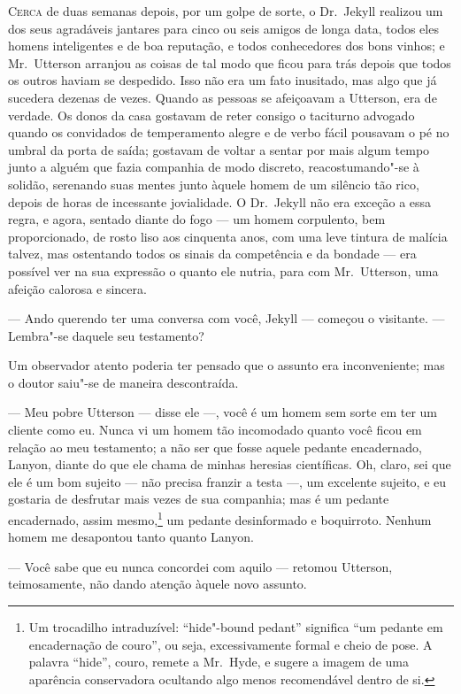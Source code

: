 \textsc{Cerca} de duas semanas depois, por um golpe de sorte, o Dr.~Jekyll
realizou um dos seus agradáveis jantares para cinco ou seis amigos de
longa data, todos eles homens inteligentes e de boa reputação, e todos
conhecedores dos bons vinhos; e Mr.~Utterson arranjou as coisas de tal
modo que ficou para trás depois que todos os outros haviam se
despedido.  Isso não era um fato inusitado, mas algo que já sucedera
dezenas de vezes.  Quando as pessoas se afeiçoavam a Utterson, era de
verdade.  Os donos da casa gostavam de reter consigo o taciturno
advogado quando os convidados de temperamento alegre e de verbo
fácil pousavam o pé no umbral da porta de saída; gostavam de voltar a
sentar por mais algum tempo junto a alguém que fazia companhia de modo
discreto, reacostumando"-se à solidão, serenando suas mentes junto
àquele homem de um silêncio tão rico, depois de horas de incessante
jovialidade.  O Dr.~Jekyll não era exceção a essa regra, e agora,
sentado diante do fogo --- um homem corpulento, bem proporcionado, de
rosto liso aos cinquenta anos, com uma leve tintura de malícia talvez,
mas ostentando todos os sinais da competência e da bondade --- era
possível ver na sua expressão o quanto ele nutria, para com Mr.~Utterson, 
uma afeição calorosa e sincera.

--- Ando querendo ter uma conversa com você, Jekyll --- começou o
visitante. --- Lembra"-se daquele seu testamento? 

Um observador atento poderia ter pensado que o assunto era
inconveniente; mas o doutor saiu"-se de maneira descontraída.

--- Meu pobre Utterson --- disse ele ---, você é um homem sem sorte em ter um
cliente como eu.  Nunca vi um homem tão incomodado quanto você ficou em
relação ao meu testamento; a não ser que fosse aquele pedante
encadernado, Lanyon, diante do que ele chama de minhas heresias
científicas.  Oh, claro, sei que ele é um bom sujeito --- não precisa
franzir a testa ---, um excelente sujeito, e eu gostaria de desfrutar mais
vezes de sua companhia; mas é um pedante encadernado, assim mesmo,\footnote{
Um trocadilho intraduzível: “hide"-bound pedant” significa “um pedante em
encadernação de couro”, ou seja, excessivamente formal e cheio de pose.
A palavra “hide”, couro, remete a Mr.~Hyde, e sugere a imagem de uma
aparência conservadora ocultando algo menos recomendável dentro de si.}
um pedante desinformado e boquirroto.  Nenhum homem
me desapontou tanto quanto Lanyon.

--- Você sabe que eu nunca concordei com aquilo --- retomou Utterson,
teimosamente, não dando atenção àquele novo assunto. 

